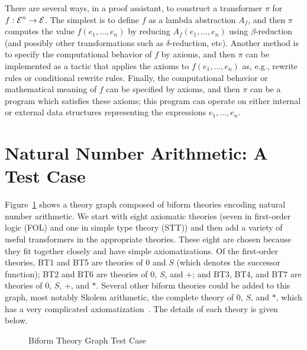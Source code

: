 \documentclass[fleqn]{llncs}
\begin{document}
There are several ways, in a proof assistant, to construct a
transformer $\pi$ for $f : \mbox{$\cal E$}^n \rightarrow \mbox{$\cal E$}$.  The simplest is to
define $f$ as a lambda abstraction $A_f$, and then $\pi$ computes the
value $f(e_1,\ldots,e_n)$ by reducing $A_f(e_1,\ldots,e_n)$ using
$\beta$-reduction (and possibly other transformations such as
$\delta$-reduction, etc).  Another method is to specify the
computational behavior of $f$ by axioms, and then $\pi$ can be
implemented as a tactic that applies the axioms to $f(e_1,\ldots,e_n)$
as, e.g., rewrite rules or conditional rewrite rules.  Finally, the
computational behavior or mathematical meaning of $f$ can be specified
by axioms, and then $\pi$ can be a program which satisfies these
axioms; this program can operate on either internal or external data
structures representing the expressions $e_1,\ldots,e_n$.

\section{Natural Number Arithmetic: A Test Case}\label{sec:test-case}

Figure~\ref{fig:biform-tg} shows a theory graph composed of biform
theories encoding natural number arithmetic.  We start with eight
axiomatic theories (seven in first-order logic (FOL) and one in simple
type theory (STT)) and then add a variety of useful transformers in
the appropriate theories.  These eight are chosen because they fit
together closely and have simple axiomatizations.  Of the first-order
theories, BT1 and BT5 are theories of $0$ and $S$ (which denotes the
successor function); BT2 and BT6 are theories of $0$, $S$, and $+$;
and BT3, BT4, and BT7 are theories of $0$, $S$, $+$, and $*$.  Several
other biform theories could be added to this graph, most notably
Skolem arithmetic, the complete theory of $0$, $S$, and $*$, which has
a very complicated axiomatization~\cite{Smorynski91}.  The details of
each theory is given below.

\begin{figure}
\center
{}
\caption{Biform Theory Graph Test Case}  \label{fig:biform-tg}
\end{figure}
\end{document}
